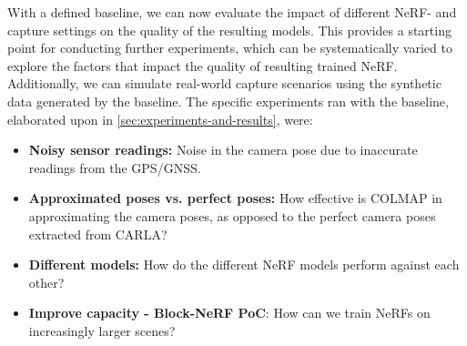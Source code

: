 With a defined baseline, we can now evaluate the impact of different NeRF- and capture settings on the quality of the resulting models. This provides a starting point for conducting further experiments, which can be systematically varied to explore the factors that impact the quality of resulting trained NeRF. Additionally, we can simulate real-world capture scenarios using the synthetic data generated by the baseline. The specific experiments ran with the baseline, elaborated upon in \autoref{sec:experiments-and-results}, were:

\begin{itemize}
    \item \textbf{Noisy sensor readings:} Noise in the camera pose due to inaccurate readings from the GPS/GNSS.
    \item \textbf{Approximated poses vs. perfect poses:} How effective is COLMAP in approximating the camera poses, as opposed to the perfect camera poses extracted from CARLA?
    \item \textbf{Different models:} How do the different NeRF models perform against each other?
    \item \textbf{Improve capacity - Block-NeRF PoC}: How can we train NeRFs on increasingly larger scenes?
\end{itemize}




















































